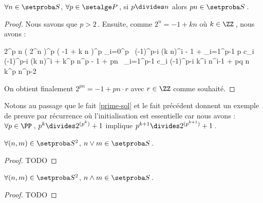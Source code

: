 \begin{fact}
	$\forall n \in \ourset$, $\forall p \in \primeset$\,,
	si $p \divides n$ alors $p n \in \ourset$\,.
\end{fact}

\begin{proof}
	Nous savons que $p > 2$\,.
	Ensuite, comme $2^n = -1 + k n$ où $k \in \ZZ$\,,
	nous avons :

    \medskip
    
    \begin{stepcalc}[style=sar]
    	2^{p n}
    \explnext{}
    	\big( 2^n \big)^p
    \explnext{}
    	\big( -1 + k n \big)^p
    \explnext{}
    	\dsum_{i=0}^p  \, (-1)^{p-i} \cdot (k n)^i
    	- 1 + \dsum_{i=1}^{p-1} p c_i \cdot (-1)^{p-i} \cdot (k n)^i + k^p \cdot n^p
    	- 1 + pn \, \dsum_{i=1}^{p-1} c_i \cdot (-1)^{p-i} \cdot k^i n^{i-1} + pq \cdot n \cdot k^p \cdot n^{p-2}
    \end{stepcalc}

    \medskip

    On obtient finalement $2^{p n} = - 1 + pn \cdot r$ avec $r \in \ZZ$ comme souhaité.
\end{proof}




Notons au passage que le fait \ref{prime-sol} et le fait précédent donnent un exemple de preuve par récurrence où l'initialisation est essentielle car nous avons :
$\forall p \in \PP$\,, $p^k \divides 2^{( p^k )} + 1$ 
implique
$p^{k+1} \divides 2^{( p^{k+1} )} + 1$\,.




\begin{fact}
	$\forall (n , m) \in \ourset^2$, $n \vee m \in \ourset$\,.
\end{fact}

\begin{proof}
	TODO
\end{proof}




\begin{fact}
	$\forall (n , m) \in \ourset^2$, $n \wedge m \in \ourset$\,.
\end{fact}

\begin{proof}
	TODO
\end{proof}




